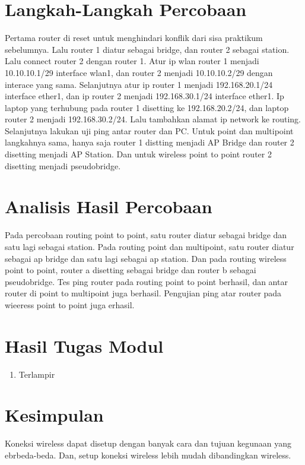 \section{Langkah-Langkah Percobaan}
Pertama router di reset untuk menghindari konflik dari sisa praktikum sebelumnya. Lalu router 1 diatur sebagai bridge, dan router 2 sebagai station. Lalu connect router 2 dengan router 1. Atur ip wlan router 1 menjadi 10.10.10.1/29 interface wlan1, dan router 2 menjadi 10.10.10.2/29 dengan interace yang sama. Selanjutnya atur ip router 1 menjadi 192.168.20.1/24 interface ether1, dan ip router 2 menjadi 192.168.30.1/24 interface ether1. Ip laptop yang terhubung pada router 1  disetting ke 192.168.20.2/24, dan laptop router 2 menjadi 192.168.30.2/24. Lalu tambahkan alamat ip network ke routing. Selanjutnya lakukan uji ping antar router dan PC. Untuk point dan multipoint langkahnya sama, hanya saja router 1 distting menjadi AP Bridge dan router 2 disetting menjadi AP Station. Dan untuk wireless point to point router 2 disetting menjadi pseudobridge.

\section{Analisis Hasil Percobaan}
Pada percobaan routing point to point, satu router diatur sebagai bridge dan satu lagi sebagai station. Pada routing point dan multipoint, satu router diatur sebagai ap bridge dan satu lagi sebagai ap station. Dan pada routing wireless point to point, router a disetting sebagai bridge dan router b sebagai pseudobridge. Tes ping router pada routing point to point berhasil, dan antar router di point to multipoint juga berhasil. Pengujian ping atar router pada wieeress point to point juga erhasil.

\section{Hasil Tugas Modul}
\begin{enumerate}
	\item Terlampir
\end{enumerate}

\section{Kesimpulan}
Koneksi wireless dapat disetup dengan banyak cara dan tujuan kegunaan yang ebrbeda-beda. Dan, setup koneksi wireless lebih mudah dibandingkan wireless.

